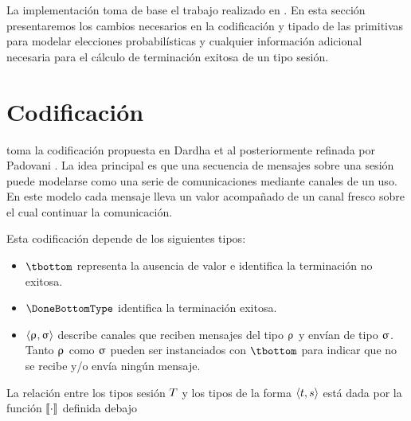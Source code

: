 La implementación toma de base el trabajo realizado en \FuSe. En esta sección
presentaremos los cambios necesarios en la codificación y tipado de las
primitivas para modelar elecciones probabilísticas y cualquier información
adicional necesaria para el cálculo de terminación exitosa de un tipo sesión.

\section{Codificación}

\FuSe toma la codificación propuesta en Dardha et al 
posteriormente refinada por Padovani . La idea principal es que una
secuencia de mensajes sobre una sesión puede modelarse como una serie de
comunicaciones mediante canales de un uso. En este modelo cada mensaje lleva un
valor acompañado de un canal fresco sobre el cual continuar la comunicación.

Esta codificación depende de los siguientes tipos:

\begin{itemize}
	\item $\tbottom$ representa la ausencia de valor e identifica la
		terminación no exitosa.
	\item $\DoneBottomType$ identifica la terminación exitosa.
	\item $\langle\uprho_{},\upsigma_{}\rangle$ describe canales que
		reciben mensajes del tipo $\uprho_{}$ y envían de tipo $\upsigma_{}$.
		Tanto $\uprho_{}$ como $\upsigma_{}$ pueden ser instanciados con
		$\tbottom$ para indicar que no se recibe y/o envía ningún
		mensaje.
\end{itemize}

La relación entre los tipos sesión $T$ y los tipos de la forma
$\langle t,s\rangle$ está dada por la función $\llbracket\cdot\rrbracket$ definida debajo

